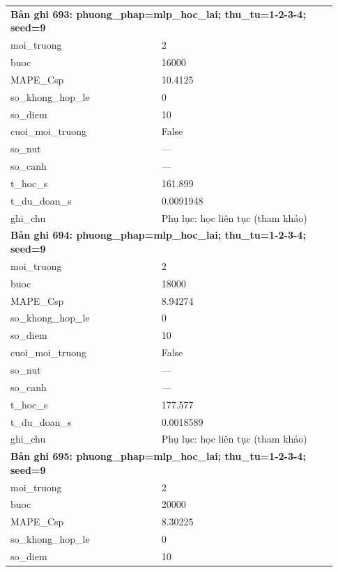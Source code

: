 \begin{longtable}{p{0.43\linewidth}p{0.50\linewidth}}
\midrule
\multicolumn{2}{p{0.95\linewidth}}{\textbf{Bản ghi 693: phuong\_phap=mlp\_hoc\_lai; thu\_tu=1-2-3-4; seed=9}} \\
moi\_\allowbreak truong & 2 \\
buoc & 16000 \\
MAPE\_\allowbreak Csp & 10.4125 \\
so\_\allowbreak khong\_\allowbreak hop\_\allowbreak le & 0 \\
so\_\allowbreak diem & 10 \\
cuoi\_\allowbreak moi\_\allowbreak truong & False \\
so\_\allowbreak nut & — \\
so\_\allowbreak canh & — \\
t\_\allowbreak hoc\_\allowbreak s & 161.899 \\
t\_\allowbreak du\_\allowbreak doan\_\allowbreak s & 0.0091948 \\
ghi\_\allowbreak chu & Phụ lục: học liên tục (tham khảo) \\
\midrule
\multicolumn{2}{p{0.95\linewidth}}{\textbf{Bản ghi 694: phuong\_phap=mlp\_hoc\_lai; thu\_tu=1-2-3-4; seed=9}} \\
moi\_\allowbreak truong & 2 \\
buoc & 18000 \\
MAPE\_\allowbreak Csp & 8.94274 \\
so\_\allowbreak khong\_\allowbreak hop\_\allowbreak le & 0 \\
so\_\allowbreak diem & 10 \\
cuoi\_\allowbreak moi\_\allowbreak truong & False \\
so\_\allowbreak nut & — \\
so\_\allowbreak canh & — \\
t\_\allowbreak hoc\_\allowbreak s & 177.577 \\
t\_\allowbreak du\_\allowbreak doan\_\allowbreak s & 0.0018589 \\
ghi\_\allowbreak chu & Phụ lục: học liên tục (tham khảo) \\
\midrule
\multicolumn{2}{p{0.95\linewidth}}{\textbf{Bản ghi 695: phuong\_phap=mlp\_hoc\_lai; thu\_tu=1-2-3-4; seed=9}} \\
moi\_\allowbreak truong & 2 \\
buoc & 20000 \\
MAPE\_\allowbreak Csp & 8.30225 \\
so\_\allowbreak khong\_\allowbreak hop\_\allowbreak le & 0 \\
so\_\allowbreak diem & 10 \\

\end{longtable}
